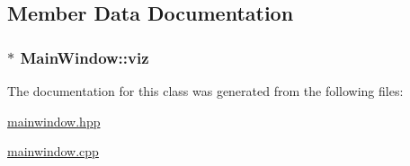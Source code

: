 \subsection{Member Data Documentation}
\hypertarget{class_main_window_a696d13650a4ba5aa28b1c920009b577f}{
\subsubsection[{viz}]{$\ast$ {\bf MainWindow::viz}}}
\label{class_main_window_a696d13650a4ba5aa28b1c920009b577f}


The documentation for this class was generated from the following files:\begin{DoxyCompactItemize}
\item 
\hyperlink{mainwindow_8hpp}{mainwindow.hpp}\item 
\hyperlink{mainwindow_8cpp}{mainwindow.cpp}\end{DoxyCompactItemize}
